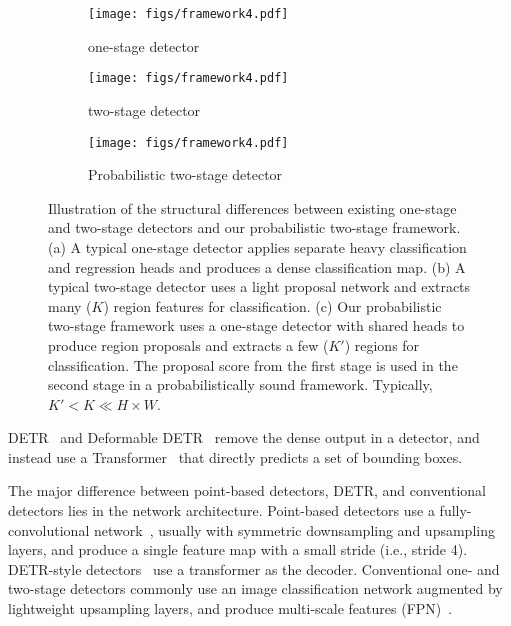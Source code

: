 \documentclass{article}
\begin{document}
\begin{figure*}[t]
\centering
\begin{subfigure}[t]{0.19\linewidth}
\texttt{[image: figs/framework4.pdf]}
\caption{one-stage detector}
\end{subfigure}\hfill
\begin{subfigure}[t]{0.33\linewidth}
\texttt{[image: figs/framework4.pdf]}
\caption{two-stage detector}
\end{subfigure}\hfill
\begin{subfigure}[t]{0.33\linewidth}
\texttt{[image: figs/framework4.pdf]}
\caption{Probabilistic two-stage detector}
\end{subfigure}\vspace{-3mm}
   \caption{
  Illustration of the structural differences between existing one-stage and two-stage detectors and our probabilistic two-stage framework. (a) A typical one-stage detector applies separate heavy classification and regression heads and produces a dense classification map. (b) A typical two-stage detector uses a light proposal network and extracts many ($K$) region features for classification. (c) Our probabilistic two-stage framework uses a one-stage detector with shared heads to produce region proposals and extracts a few ($K'$) regions for classification. The proposal score from the first stage is used in the second stage in a probabilistically sound framework. Typically, $K' < K \ll H \times W$.
   }
\label{fig:difference}
\vspace{-4mm}
\end{figure*}

DETR~\cite{carion2020end} and Deformable DETR~\cite{zhu2020deformable} remove the dense output in a detector, and instead use a Transformer~\cite{vaswani2017attention} that directly predicts a set of bounding boxes.

The major difference between point-based detectors, DETR, and conventional detectors lies in the network architecture.
Point-based detectors use a fully-convolutional network~\cite{newell2016stacked,yu2018deep}, usually with symmetric downsampling and upsampling layers, and produce a single feature map with a small stride (i.e., stride 4).
DETR-style detectors~\cite{carion2020end,zhu2020deformable} use a transformer as the decoder.
Conventional one- and two-stage detectors commonly use an image classification network augmented by lightweight upsampling layers, and produce multi-scale features (FPN)~\cite{lin2017feature}.
\end{document}
